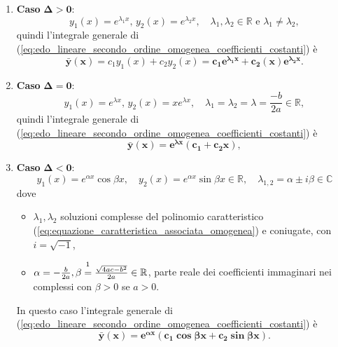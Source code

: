 \begin{enumerate}
	\item \textbf{Caso} $\boldsymbol{\Delta>0}$:
	\begin{equation}\label{eq:soluzioni_omogenea_secondo_grado_delta_negativa}
		y_1(x) = e^{\lambda_1 x},\, y_2(x) = e^{\lambda_2 x},\quad \lambda_1,\lambda_2\in\mathbb{R}\text{ e } \lambda_1\neq\lambda_2,
	\end{equation}
	quindi l'integrale generale di (\ref{eq:edo_lineare_secondo_ordine_omogenea_coefficienti_costanti}) è
	\begin{equation}\label{eq:integrale_generale_edo_lineare_secondo_ordine_omogenea_coefficienti_costanti_Delta_>_0}
		\boldsymbol{\bar y(x)} = c_1 y_1(x)+ c_2y_2(x) = \boldsymbol{c_1 e^{\lambda_1 x} + c_2(x) e^{\lambda_2 x}}.
	\end{equation}
	\item \textbf{Caso} $\boldsymbol{\Delta = 0}$:
	\begin{equation}\label{eq:soluzioni_omogenea_secondo_grado_delta_zero}
		y_1(x) = e^{\lambda x},\, y_2(x)=x e^{\lambda x},\quad \lambda_1=\lambda_2=\lambda=\frac{-b}{2a}\in\mathbb{R},
	\end{equation}
	quindi l'integrale generale di (\ref{eq:edo_lineare_secondo_ordine_omogenea_coefficienti_costanti}) è
	\begin{equation}\label{eq:integrale_generale_edo_lineare_secondo_ordine_omogenea_coefficienti_costanti_Delta_=_0}
		\boldsymbol{\bar y(x) = e^{\lambda x}(c_1+c_2 x)}, 
	\end{equation}
	\item \textbf{Caso} $\boldsymbol{\Delta<0}$:
	\begin{equation}\label{eq:soluzioni_omogenea_secondo_grado_delta_positiva}
		y_1(x) = e^{\alpha x}\cos\beta x,\quad y_2(x) = e^{\alpha x} \sin\beta x\in\mathbb{R},\quad \lambda_{1,2}=\alpha \pm i \beta\in\mathbb{C}
	\end{equation}
	dove
	\begin{itemize}
		\item $\lambda_1,\lambda_2$ soluzioni complesse del polinomio caratteristico (\ref{eq:equazione_caratteristica_associata_omogenea}) e coniugate, con $i=\sqrt{-1}$,
		\item $\alpha = -\frac{b}{2a}, \beta\overset{\footnotemark}{=}\frac{\sqrt{4ac-b^2}}{2a}\in\mathbb{R}$, parte reale dei coefficienti immaginari nei complessi con $\beta>0$ se $a>0$.
	\end{itemize}
	In questo caso l'integrale generale di (\ref{eq:edo_lineare_secondo_ordine_omogenea_coefficienti_costanti}) è
	\begin{equation}\label{eq:integrale_generale_edo_lineare_secondo_ordine_omogenea_coefficienti_costanti_Delta_<_0}
		\boldsymbol{\bar y(x) = e^{\alpha x}(c_1\cos\beta x + c_2\sin\beta x)}.
	\end{equation}
\end{enumerate}

